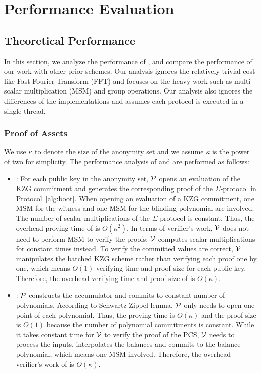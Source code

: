 \chapter{Performance Evaluation}

\section{Theoretical Performance}

In this section, we analyze the performance of \Sys, and compare the performance of our work with other prior schemes. Our analysis ignores the relatively trivial cost like Fast Fourier Transform (FFT) and focuses on the heavy work such as multi-scalar multiplication (MSM) and group operations. Our analysis also ignores the differences of the implementations and assumes each protocol is executed in a single thread.
\subsection{Proof of Assets}

We use $\kappa$ to denote the size of the anonymity set and we assume $\kappa$ is the power of two for simplicity. The performance analysis of \bootstrap and \userproof are performed as follows:
\begin{itemize}
\item \bootstrap: For each public key in the anonymity set, $\mathcal{P}$ opens an evaluation of the KZG commitment and generates the corresponding proof of the $\Sigma$-protocol in Protocol~\ref{alg:boot}. When opening an evaluation of a KZG commitment, one MSM for the witness and one MSM for the blinding polynomial are involved. The number of scalar multiplications of the $\Sigma$-protocol is constant. Thus, the overhead proving time of \bootstrap is $O(\kappa^2)$. In terms of verifier's work, $\mathcal{V}$ does not need to perform MSM to verify the proofs; $\mathcal{V}$ computes scalar multiplications for constant times instead. To verify the committed values are correct, $\mathcal{V}$ manipulates the batched KZG scheme rather than verifying each proof one by one, which means $O(1)$ verifying time and proof size for each public key. Therefore, the overhead verifying time and proof size of \bootstrap is $O(\kappa)$.
\item \poa: $\mathcal{P}$ constructs the accumulator and commits to constant number of polynomials. According to Schwartz-Zippel lemma, $\mathcal{P}$ only needs to open one point of each polynomial. Thus, the proving time is $O(\kappa)$ and the proof size is $O(1)$ because the number of polynomial commitments is constant. While it takes constant time for $\mathcal{V}$ to verify the proof of the PCS, $\mathcal{V}$ needs to process the inputs, \ie interpolates the balances and commits to the balance polynomial, which means one MSM involved. Therefore, the overhead verifier's work of \poa is $O(\kappa)$.
\end{itemize}

